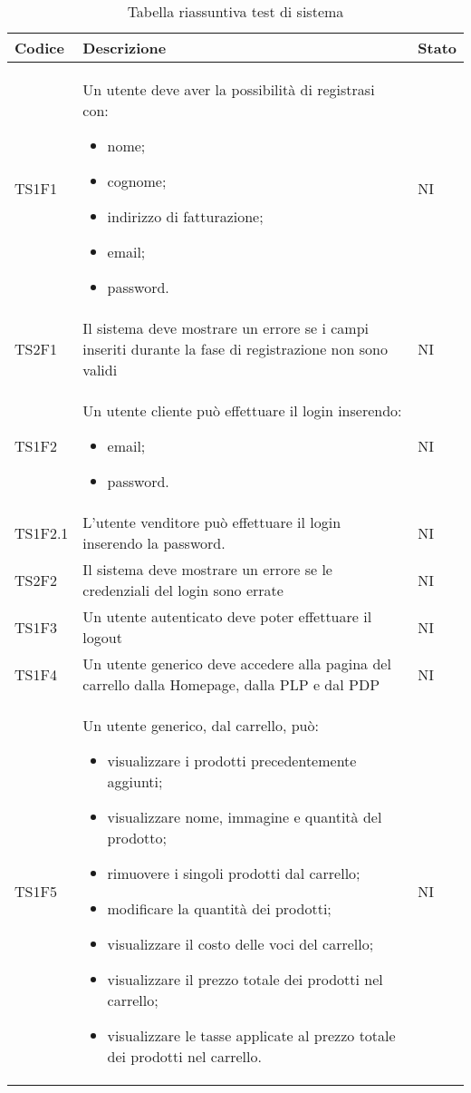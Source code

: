 {

\centering
\renewcommand{\arraystretch}{2}
\begin{longtable}{C{3cm} C{10.2cm} C{1.5cm}}
\caption{Tabella riassuntiva test di sistema}\\
\textbf{Codice} &
\textbf{Descrizione}&
\textbf{Stato}\\
\endhead


TS1F1 & Un utente deve aver la possibilità di registrasi con:
\begin{itemize}
	\item nome;
	\item cognome;
	\item indirizzo di fatturazione;
	\item email;
	\item password.
\end{itemize} & NI\\
TS2F1 & Il sistema deve mostrare un errore se
i campi inseriti durante la fase di registrazione non sono validi & NI\\
TS1F2 & Un utente cliente può effettuare il login inserendo:
\begin{itemize}
	\item email;
	\item password.
\end{itemize} &  NI\\
TS1F2.1 & L'utente venditore può effettuare il login inserendo la password. &  NI\\
TS2F2 & Il sistema deve mostrare un errore se le credenziali del login sono errate & NI\\
TS1F3 & Un utente autenticato deve poter effettuare il
logout & NI\\
TS1F4 & Un utente generico deve accedere alla pagina del carrello dalla Homepage, dalla PLP e dal PDP & NI\\
TS1F5 & Un utente generico, dal carrello, può:
\begin{itemize}
	\item visualizzare i prodotti precedentemente aggiunti;
	\item visualizzare nome, immagine e quantità del prodotto;
	\item rimuovere i singoli prodotti dal carrello;
	\item modificare la quantità dei prodotti;
	\item visualizzare il costo delle voci del carrello;
	\item visualizzare il prezzo totale dei prodotti nel carrello;
	\item visualizzare le tasse applicate al prezzo totale dei prodotti nel carrello.
\end{itemize}
& NI\\


\end{longtable}}
